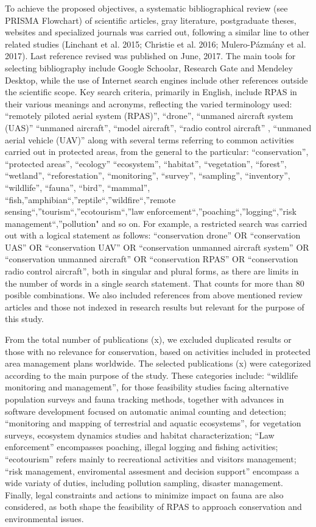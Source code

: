 \documentclass[]{interact}
\theoremstyle{plain}%
\theoremstyle{definition}
\theoremstyle{remark}
\begin{document}
To achieve the proposed objectives, a systematic bibliographical review
(see PRISMA Flowchart) of scientific articles, gray literature,
postgraduate theses, websites and specialized journals was carried out,
following a similar line to other related studies (Linchant et al. 2015;
Christie et al. 2016; Mulero-Pázmány et al. 2017). Last reference
revised was published on June, 2017. The main tools for selecting
bibliography include Google Schoolar, Research Gate and Mendeley
Desktop, while the use of Internet search engines include other
references outside the scientific scope. Key search criteria, primarily
in English, include RPAS in their various meanings and acronyms,
reflecting the varied terminology used: ``remotely piloted aerial system
(RPAS)'', ``drone'', ``unmaned aircraft system (UAS)'' ``unmaned
aircraft'', ``model aircraft'', ``radio control aircraft'' , ``unmaned
aerial vehicle (UAV)'' along with several terms referring to common
activities carried out in protected areas, from the general to the
particular: ``conservation'', ``protected areas'', ``ecology''
``ecosystem'', ``habitat'', ``vegetation'', ``forest'', ``wetland'',
``reforestation'', ``monitoring'', ``survey'', ``sampling'',
``inventory'', ``wildlife'', ``fauna'', ``bird'', ``mammal'',
``fish,''amphibian``,''reptile``,''wildfire``,''remote
sensing``,''tourism``,''ecotourism``,''law
enforcement``,''poaching``,''logging``,''risk management``,''pollution"
and so on. For example, a restricted search was carried out with a
logical statement as follows: ``conservation drone'' OR ``conservation
UAS'' OR ``conservation UAV'' OR ``conservation unmanned aircraft
system'' OR ``conservation unmanned aircraft'' OR ``conservation RPAS''
OR ``conservation radio control aircraft'', both in singular and plural
forms, as there are limits in the number of words in a single search
statement. That counts for more than 80 posible combinations. We also
included references from above mentioned review articles and those not
indexed in research results but relevant for the purpose of this study.

From the total number of publications (x), we excluded duplicated
results or those with no relevance for conservation, based on activities
included in protected area management plans worldwide. The selected
publications (x) were categorized according to the main purpose of the
study. These categories include: ``wildlife monitoring and management'',
for those feasibility studies facing alternative population surveys and
fauna tracking methods, together with advances in software development
focused on automatic animal counting and detection; ``monitoring and
mapping of terrestrial and aquatic ecosystems'', for vegetation surveys,
ecosystem dynamics studies and habitat characterization; ``Law
enforcement'' encompasses poaching, illegal logging and fishing
activities; ``ecotourism'' refers mainly to recreational activities and
visitors management; ``risk management, enviromental assesment and
decision support'' encompass a wide variaty of duties, including
pollution sampling, disaster management. Finally, legal constraints and
actions to minimize impact on fauna are also considered, as both shape
the feasibility of RPAS to approach conservation and environmental
issues.
\end{document}
